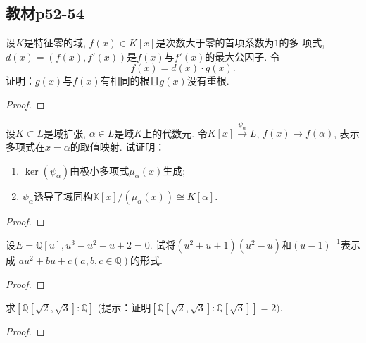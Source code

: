 \subsection{教材p52-54}

\begin{problem}
    设$K$是特征零的域, $f(x) \in K[x]$是次数大于零的首项系数为$1$的多
项式, $d(x) = (f(x), f'(x))$是$f(x)$与$f'(x)$的最大公因子. 令
\[
    f(x) = d(x) \cdot g(x).
\]
证明：$g(x)$与$f(x)$有相同的根且$g(x)$没有重根.
\end{problem}

\begin{proof}
    
\end{proof}

\begin{problem}
    设$K \subset L$是域扩张, $\alpha \in L$是域$K$上的代数元.
令$K[x] \xrightarrow{\psi_{\alpha}}L$,
$f(x) \mapsto f(\alpha)$, 表示多项式在$x = \alpha$的取值映射.
试证明：
\begin{enumerate}[(1)]
    \item $\ker(\psi_\alpha)$由极小多项式$\mu_\alpha(x)$生成;
    \item $\psi_\alpha$诱导了域同构$\mathbb{K}[x]/(\mu_\alpha(x)) \cong K[\alpha]$.
\end{enumerate}
\end{problem}

\begin{proof}
    
\end{proof}

\begin{problem}
    设$E = \mathbb{Q}[u], u^3 - u^2 + u + 2 = 0$.
试将$(u^2 + u + 1)(u^2 - u)$和$(u - 1)^{-1}$表示成
$au^2 + bu + c (a, b, c \in \mathbb{Q})$的形式.
\end{problem}

\begin{proof}
    
\end{proof}

\begin{problem}
    求$[\mathbb{Q}[\sqrt2, \sqrt3]:\mathbb{Q}]$
(提示：证明$\left[\mathbb{Q}[\sqrt2, \sqrt3]:\mathbb{Q}[\sqrt3]\right] = 2)$.
\end{problem}

\begin{proof}
    
\end{proof}

